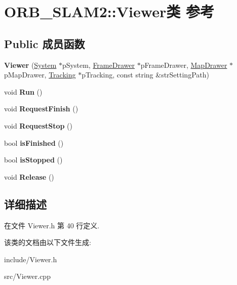 \hypertarget{classORB__SLAM2_1_1Viewer}{\section{O\-R\-B\-\_\-\-S\-L\-A\-M2\-:\-:Viewer类 参考}
\label{classORB__SLAM2_1_1Viewer}
}
\subsection*{Public 成员函数}
\begin{DoxyCompactItemize}
\item 
\hypertarget{classORB__SLAM2_1_1Viewer_abe1f6eab6a1976e589f37a14b80c448b}{{\bfseries Viewer} (\hyperlink{classORB__SLAM2_1_1System}{System} $\ast$p\-System, \hyperlink{classORB__SLAM2_1_1FrameDrawer}{Frame\-Drawer} $\ast$p\-Frame\-Drawer, \hyperlink{classORB__SLAM2_1_1MapDrawer}{Map\-Drawer} $\ast$p\-Map\-Drawer, \hyperlink{classORB__SLAM2_1_1Tracking}{Tracking} $\ast$p\-Tracking, const string \&str\-Setting\-Path)}\label{classORB__SLAM2_1_1Viewer_abe1f6eab6a1976e589f37a14b80c448b}

\item 
\hypertarget{classORB__SLAM2_1_1Viewer_a68c269890714298034997be622f09947}{void {\bfseries Run} ()}\label{classORB__SLAM2_1_1Viewer_a68c269890714298034997be622f09947}

\item 
\hypertarget{classORB__SLAM2_1_1Viewer_af9079c4e563099cf3c8cda403c854cf8}{void {\bfseries Request\-Finish} ()}\label{classORB__SLAM2_1_1Viewer_af9079c4e563099cf3c8cda403c854cf8}

\item 
\hypertarget{classORB__SLAM2_1_1Viewer_a4b23bbdcc2c5898d074870785a3e07c5}{void {\bfseries Request\-Stop} ()}\label{classORB__SLAM2_1_1Viewer_a4b23bbdcc2c5898d074870785a3e07c5}

\item 
\hypertarget{classORB__SLAM2_1_1Viewer_a51c55a1f1ad05a6ba2c6b57f9133f88d}{bool {\bfseries is\-Finished} ()}\label{classORB__SLAM2_1_1Viewer_a51c55a1f1ad05a6ba2c6b57f9133f88d}

\item 
\hypertarget{classORB__SLAM2_1_1Viewer_aa1888ef340152348f395a814ddfb362f}{bool {\bfseries is\-Stopped} ()}\label{classORB__SLAM2_1_1Viewer_aa1888ef340152348f395a814ddfb362f}

\item 
\hypertarget{classORB__SLAM2_1_1Viewer_a2b0eeffd84b5d94a4c4f4e0db174c9fe}{void {\bfseries Release} ()}\label{classORB__SLAM2_1_1Viewer_a2b0eeffd84b5d94a4c4f4e0db174c9fe}

\end{DoxyCompactItemize}


\subsection{详细描述}


在文件 Viewer.\-h 第 40 行定义.



该类的文档由以下文件生成\-:\begin{DoxyCompactItemize}
\item 
include/Viewer.\-h\item 
src/Viewer.\-cpp\end{DoxyCompactItemize}
